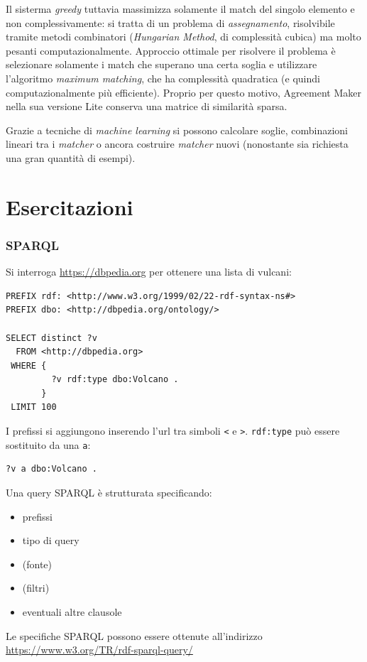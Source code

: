 \documentclass[11pt]{article}
\begin{document}
Il sisterma \textit{greedy} tuttavia massimizza solamente il match del singolo elemento e non complessivamente: si tratta di un problema di \textit{assegnamento}, risolvibile tramite metodi combinatori (\textit{Hungarian Method}, di complessità cubica) ma molto pesanti computazionalmente.
Approccio ottimale per risolvere il problema è selezionare solamente i match che superano una certa soglia e utilizzare l'algoritmo \textit{maximum matching}, che ha complessità quadratica (e quindi computazionalmente più efficiente).
Proprio per questo motivo, Agreement Maker nella sua versione Lite conserva una matrice di similarità sparsa.

Grazie a tecniche di \textit{machine learning} si possono calcolare soglie, combinazioni lineari tra i \textit{matcher} o ancora costruire \textit{matcher} nuovi (nonostante sia richiesta una gran quantità di esempi).

\newpage
\part{Esercitazioni}

\section{SPARQL}
Si interroga \url{https://dbpedia.org} per ottenere una lista di vulcani:
\begin{lstlisting}[language=sparql]
PREFIX rdf: <http://www.w3.org/1999/02/22-rdf-syntax-ns#>
PREFIX dbo: <http://dbpedia.org/ontology/>

SELECT distinct ?v
  FROM <http://dbpedia.org>
 WHERE {
         ?v rdf:type dbo:Volcano .
       }
 LIMIT 100
\end{lstlisting}
I prefissi si aggiungono inserendo l'url tra simboli \verb|<| e \verb|>|.
\verb|rdf:type| può essere sostituito da una \verb|a|:
\begin{lstlisting}[language=sparql]
?v a dbo:Volcano .
\end{lstlisting}

Una query SPARQL è strutturata specificando:
\begin{itemize}
  \item prefissi
  \item tipo di query
  \item (fonte)
  \item (filtri)
  \item eventuali altre clausole
\end{itemize}
Le specifiche SPARQL possono essere ottenute all'indirizzo \url{https://www.w3.org/TR/rdf-sparql-query/}
\end{document}
